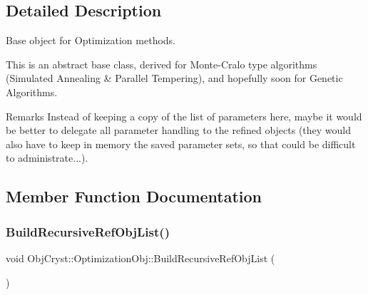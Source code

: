 \subsection{Detailed Description}
Base object for Optimization methods. 

This is an abstract base class, derived for Monte-\/\+Cralo type algorithms (Simulated Annealing \& Parallel Tempering), and hopefully soon for Genetic Algorithms.

\begin{DoxyRemark}{Remarks}
Instead of keeping a copy of the list of parameters here, maybe it would be better to delegate all parameter handling to the refined objects (they would also have to keep in memory the saved parameter sets, so that could be difficult to administrate...). 
\end{DoxyRemark}


\subsection{Member Function Documentation}
\mbox{\label{class_obj_cryst_1_1_optimization_obj_a7c819c5f8fc52caafd97ea9d468da2be}} 
\subsubsection{\texorpdfstring{BuildRecursiveRefObjList()}{BuildRecursiveRefObjList()}}
{\footnotesize\ttfamily void Obj\+Cryst\+::\+Optimization\+Obj\+::\+Build\+Recursive\+Ref\+Obj\+List (\begin{DoxyParamCaption}{ }\end{DoxyParamCaption})\hspace{0.3cm}{\ttfamily [protected]}}


